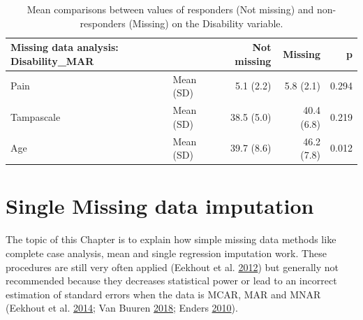 \documentclass[
]{book}
\newenvironment{Shaded}{\begin{snugshade}}{\end{snugshade}}
\newcommand{\DataTypeTok}[1]{\textcolor[rgb]{0.13,0.29,0.53}{#1}}
\newcommand{\KeywordTok}[1]{\textcolor[rgb]{0.13,0.29,0.53}{\textbf{#1}}}
\newcommand{\NormalTok}[1]{#1}
\newcommand{\OperatorTok}[1]{\textcolor[rgb]{0.81,0.36,0.00}{\textbf{#1}}}
\newcommand{\OtherTok}[1]{\textcolor[rgb]{0.56,0.35,0.01}{#1}}
\newcommand{\StringTok}[1]{\textcolor[rgb]{0.31,0.60,0.02}{#1}}
\begin{document}
\begin{Shaded}
\end{Shaded}

\begin{table}

\caption{\label{tab:unnamed-chunk-55}Mean comparisons between values of responders (Not missing) and 
        non-responders (Missing) on the Disability variable.}
\centering
\begin{tabular}[t]{l|l|r|r|r}
\hline
Missing data analysis: Disability\_MAR &   & Not missing & Missing & p\\
\hline
Pain & Mean (SD) & 5.1 (2.2) & 5.8 (2.1) & 0.294\\
\hline
Tampascale & Mean (SD) & 38.5 (5.0) & 40.4 (6.8) & 0.219\\
\hline
Age & Mean (SD) & 39.7 (8.6) & 46.2 (7.8) & 0.012\\
\hline
\end{tabular}
\end{table}

\hypertarget{single-missing-data-imputation}{%
\chapter{Single Missing data
imputation}\label{single-missing-data-imputation}}

The topic of this Chapter is to explain how simple missing data methods
like complete case analysis, mean and single regression imputation work.
These procedures are still very often applied (Eekhout et al.
\protect\hyperlink{ref-Eekhout2012}{2012}) but generally not recommended
because they decreases statistical power or lead to an incorrect
estimation of standard errors when the data is MCAR, MAR and MNAR
(Eekhout et al. \protect\hyperlink{ref-Eekhout2014}{2014}; Van Buuren
\protect\hyperlink{ref-VanBuuren2018}{2018}; Enders
\protect\hyperlink{ref-enders2010applied}{2010}).
\end{document}
